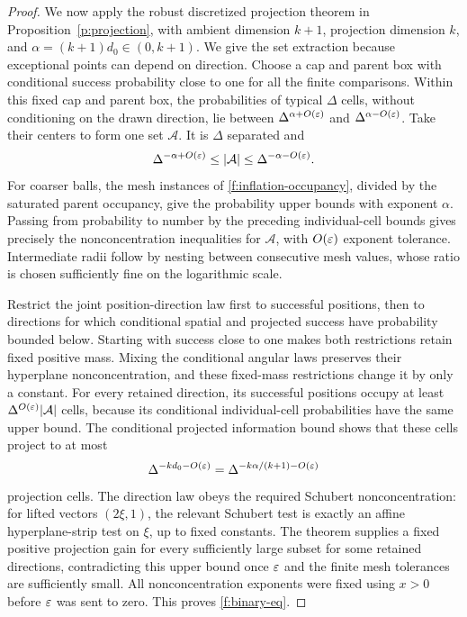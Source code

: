 \begin{proof}
We now apply the robust discretized projection theorem in
Proposition~\ref{p:projection}, with ambient dimension $k+1$,
projection dimension $k$, and
$\alpha=(k+1)d_0\in(0,k+1)$. We give the set extraction because
exceptional points can depend on direction. Choose a cap and parent
box with conditional success probability close to one for all the
finite comparisons. Within this fixed cap and parent box, the
probabilities of typical $\Delta$ cells, without conditioning on the
drawn direction, lie between
$\Delta^{\alpha+O(\varepsilon)}$ and $\Delta^{\alpha-O(\varepsilon)}$.
Take their centers to form one set $\mathcal A$. It is
$\Delta$ separated and
\[
 \Delta^{-\alpha+O(\varepsilon)}\le|\mathcal A|
                         \le\Delta^{-\alpha-O(\varepsilon)}.
\]
For coarser balls, the mesh instances of
\eqref{f:inflation-occupancy}, divided by the saturated parent
occupancy, give the probability upper bounds with exponent
$\alpha$. Passing from probability to number by the preceding
individual-cell bounds gives precisely the nonconcentration
inequalities for $\mathcal A$, with $O(\varepsilon)$ exponent tolerance.
Intermediate radii follow by nesting between consecutive mesh
values, whose ratio is chosen sufficiently fine on the logarithmic
scale.

Restrict the joint position-direction law first to successful
positions, then to directions for which conditional spatial and
projected success have probability bounded below. Starting with
success close to one makes both restrictions retain fixed positive
mass. Mixing the conditional angular laws preserves their
hyperplane nonconcentration, and these fixed-mass restrictions
change it by only a constant. For every retained direction, its
successful positions occupy at least
$\Delta^{O(\varepsilon)}|\mathcal A|$ cells, because its conditional
individual-cell probabilities have the same upper bound. The
conditional projected information bound shows that these cells
project to at most
\[
 \Delta^{-kd_0-O(\varepsilon)}
 =\Delta^{-k\alpha/(k+1)-O(\varepsilon)}
\]
projection cells. The direction law obeys the required Schubert
nonconcentration: for lifted vectors $(2\xi,1)$, the relevant
Schubert test is exactly an affine hyperplane-strip test on $\xi$,
up to fixed constants. The theorem supplies a fixed positive
projection gain for every sufficiently large subset for some
retained directions, contradicting this upper bound once $\varepsilon$
and the finite mesh tolerances are sufficiently small. All
nonconcentration exponents were fixed using $x>0$ before $\varepsilon$
was sent to zero. This proves \eqref{f:binary-eq}.
\end{proof}

